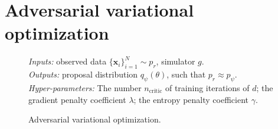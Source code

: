 \documentclass[twocolumn,superscriptaddress,aps]{revtex4-1}
\theoremstyle{plain}
\begin{document}

\section{Adversarial variational optimization}

\begin{figure*}
    \begin{minipage}{\linewidth}
    \begin{algorithm}[H]
    \caption{Adversarial variational optimization.}

    \begin{flushleft}
        {\it Inputs:} observed data $\{ \mathbf{x}_i \}_{i=1}^N \sim p_r$, simulator $g$.\\
        {\it Outputs:} proposal distribution $q_\psi(\theta)$, such that $p_r \approx p_\psi$.\\
        {\it Hyper-parameters:} The number $n_{\text{critic}}$ of training iterations of $d$; the gradient penalty coefficient $\lambda$; the entropy penalty coefficient $\gamma$.
    \end{flushleft}

    \label{alg:avo}
    \begin{algorithmic}[1]
             
                \EndFor
            \EndFor
              
        \EndWhile
    \end{algorithmic}
    \end{algorithm}
    \end{minipage}
\end{figure*}
\end{document}
